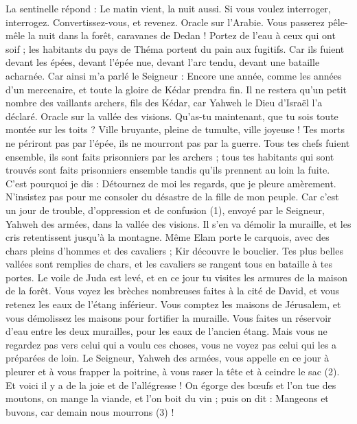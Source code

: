 \begin{multicols}{2}
La sentinelle répond : Le matin vient, la nuit aussi. Si vous voulez interroger, interrogez. Convertissez-vous, et revenez.
Oracle sur l'Arabie. Vous passerez pêle-mêle la nuit dans la forêt, caravanes de Dedan !
Portez de l’eau à ceux qui ont soif ; les habitants du pays de Théma portent du pain aux fugitifs.
Car ils fuient devant les épées, devant l'épée nue, devant l'arc tendu, devant une bataille acharnée.
Car ainsi m’a parlé le Seigneur : Encore une année, comme les années d’un mercenaire, et toute la gloire de Kédar prendra fin.
Il ne restera qu’un petit nombre des vaillants archers, fils des Kédar, car Yahweh le Dieu d'Israël l’a déclaré.
\VerseOne{}Oracle sur la vallée des visions. Qu'as-tu maintenant, que tu sois toute montée sur les toits ?
Ville bruyante, pleine de tumulte, ville joyeuse ! Tes morts ne périront pas par l'épée, ils ne mourront pas par la guerre.
Tous tes chefs fuient ensemble, ils sont faits prisonniers par les archers ; tous tes habitants qui sont trouvés sont faits prisonniers ensemble tandis qu’ils prennent au loin la fuite.
C'est pourquoi je dis : Détournez de moi les regards, que je pleure amèrement. N’insistez pas pour me consoler du désastre de la fille de mon peuple.
Car c'est un jour de trouble, d'oppression et de confusion (1), envoyé par le Seigneur, Yahweh des armées, dans la vallée des visions. Il s'en va démolir la muraille, et les cris retentissent jusqu'à la montagne.
Même Elam porte le carquois, avec des chars pleins d’hommes et des cavaliers ; Kir découvre le bouclier.
Tes plus belles vallées sont remplies de chars, et les cavaliers se rangent tous en bataille à tes portes.
Le voile de Juda est levé, et en ce jour tu visites les armures de la maison de la forêt.
Vous voyez les brèches nombreuses faites à la cité de David, et vous retenez les eaux de l’étang inférieur.
Vous comptez les maisons de Jérusalem, et vous démolissez les maisons pour fortifier la muraille.
Vous faites un réservoir d'eau entre les deux murailles, pour les eaux de l’ancien étang. Mais vous ne regardez pas vers celui qui a voulu ces choses, vous ne voyez pas celui qui les a préparées de loin.
Le Seigneur, Yahweh des armées, vous appelle en ce jour à pleurer et à vous frapper la poitrine, à vous raser la tête et à ceindre le sac (2).
Et voici il y a de la joie et de l'allégresse ! On égorge des bœufs et l’on tue des moutons, on mange la viande, et l’on boit du vin ; puis on dit : Mangeons et buvons, car demain nous mourrons (3) !

\end{multicols}
